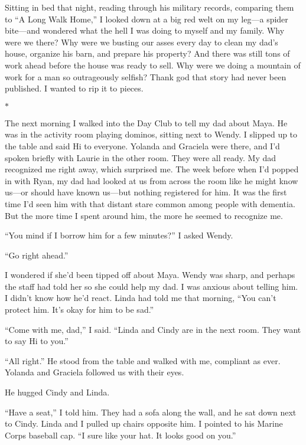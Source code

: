\documentclass[12pt]{book}
\begin{document}
Sitting in bed that night, reading through his military records, comparing them to ``A Long Walk Home,'' I looked down at a big red welt on my leg---a spider bite---and wondered what the hell I was doing to myself and my family. Why were we there? Why were we busting our asses every day to clean my dad's house, organize his barn, and prepare his property? And there was still tons of work ahead before the house was ready to sell. Why were we doing a mountain of work for a man so outrageously selfish? Thank god that story had never been published. I wanted to rip it to pieces.

\begin{center}$*$\end{center}

The next morning I walked into the Day Club to tell my dad about Maya. He was in the activity room playing dominos, sitting next to Wendy. I slipped up to the table and said Hi to everyone. Yolanda and Graciela were there, and I'd spoken briefly with Laurie in the other room. They were all ready. My dad recognized me right away, which surprised me. The week before when I'd popped in with Ryan, my dad had looked at us from across the room like he might know us---or should have known us---but nothing registered for him. It was the first time I'd seen him with that distant stare common among people with dementia. But the more time I spent around him, the more he seemed to recognize me.

``You mind if I borrow him for a few minutes?'' I asked Wendy.

``Go right ahead.''

I wondered if she'd been tipped off about Maya. Wendy was sharp, and perhaps the staff had told her so she could help my dad. I was anxious about telling him. I didn't know how he'd react. Linda had told me that morning, ``You can't protect him. It's okay for him to be sad.''

``Come with me, dad,'' I said. ``Linda and Cindy are in the next room. They want to say Hi to you.''

``All right.'' He stood from the table and walked with me, compliant as ever. Yolanda and Graciela followed us with their eyes.

He hugged Cindy and Linda.

``Have a seat,'' I told him. They had a sofa along the wall, and he sat down next to Cindy. Linda and I pulled up chairs opposite him. I pointed to his Marine Corps baseball cap. ``I sure like your hat. It looks good on you.''
\end{document}
